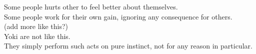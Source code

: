 Some people hurts other to feel better about themselves.\\
Some people work for their own gain, ignoring any consequence for others.\\
(add more like this?)\\

Yoki are not like this.\\
They simply perform such acts on pure instinct, 
not for any reason in particular.